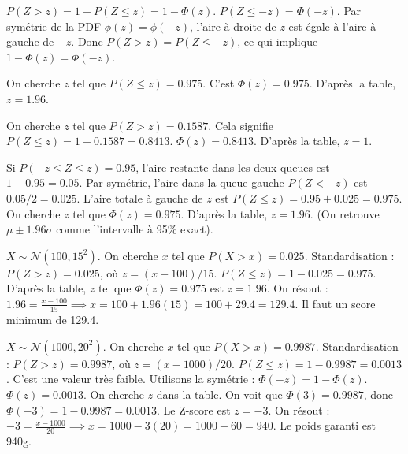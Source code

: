 \begin{correctionbox}
$P(Z > z) = 1 - P(Z \le z) = 1 - \Phi(z)$.
$P(Z \le -z) = \Phi(-z)$.
Par symétrie de la PDF $\phi(z) = \phi(-z)$, l'aire à droite de $z$ est égale à l'aire à gauche de $-z$.
Donc $P(Z > z) = P(Z \le -z)$, ce qui implique $1 - \Phi(z) = \Phi(-z)$.
\end{correctionbox}

\begin{correctionbox}
On cherche $z$ tel que $P(Z \le z) = 0.975$.
C'est $\Phi(z) = 0.975$. D'après la table, $z = 1.96$.
\end{correctionbox}

\begin{correctionbox}
On cherche $z$ tel que $P(Z > z) = 0.1587$.
Cela signifie $P(Z \le z) = 1 - 0.1587 = 0.8413$.
$\Phi(z) = 0.8413$. D'après la table, $z = 1$.
\end{correctionbox}

\begin{correctionbox}
Si $P(-z \le Z \le z) = 0.95$, l'aire restante dans les deux queues est $1 - 0.95 = 0.05$.
Par symétrie, l'aire dans la queue gauche $P(Z < -z)$ est $0.05 / 2 = 0.025$.
L'aire totale à gauche de $z$ est $P(Z \le z) = 0.95 + 0.025 = 0.975$.
On cherche $z$ tel que $\Phi(z) = 0.975$.
D'après la table, $z = 1.96$. (On retrouve $\mu \pm 1.96\sigma$ comme l'intervalle à 95\% exact).
\end{correctionbox}

\begin{correctionbox}
$X \sim \mathcal{N}(100, 15^2)$. On cherche $x$ tel que $P(X > x) = 0.025$.
Standardisation : $P(Z > z) = 0.025$, où $z = (x-100)/15$.
$P(Z \le z) = 1 - 0.025 = 0.975$.
D'après la table, $z$ tel que $\Phi(z)=0.975$ est $z=1.96$.
On résout : $1.96 = \frac{x - 100}{15} \implies x = 100 + 1.96(15) = 100 + 29.4 = 129.4$.
Il faut un score minimum de 129.4.
\end{correctionbox}

\begin{correctionbox}
$X \sim \mathcal{N}(1000, 20^2)$. On cherche $x$ tel que $P(X > x) = 0.9987$.
Standardisation : $P(Z > z) = 0.9987$, où $z = (x-1000)/20$.
$P(Z \le z) = 1 - 0.9987 = 0.0013$.
C'est une valeur très faible. Utilisons la symétrie : $\Phi(-z) = 1 - \Phi(z)$.
$\Phi(z) = 0.0013$. On cherche $z$ dans la table.
On voit que $\Phi(3) = 0.9987$, donc $\Phi(-3) = 1 - 0.9987 = 0.0013$.
Le Z-score est $z = -3$.
On résout : $-3 = \frac{x - 1000}{20} \implies x = 1000 - 3(20) = 1000 - 60 = 940$.
Le poids garanti est 940g.
\end{correctionbox}

